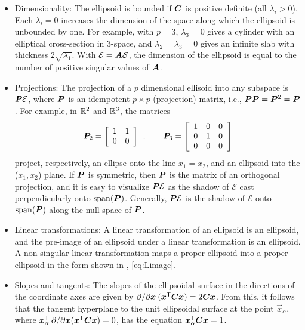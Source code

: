 \begin{itemize}
 \item Dimensionality: The ellipsoid is bounded if $\bm{C}$ is positive definite (all $\lambda_i > 0$).
 Each $\lambda_i = 0$ increases the dimension of the space along which the ellipsoid is unbounded by one.
For example, with $p=3$, $\lambda_3=0$ gives a
cylinder with an elliptical cross-section in 3-space, and  $\lambda_2 = \lambda_3=0$ gives an infinite slab with thickness $2 \sqrt{\lambda_1}$. With $\mathcal{E} = \bm{A} \mathcal{S}$, the dimension of the ellipsoid is equal to the number of positive singular values of $\bm{A}$.
 \item Projections: The projection of a $p$ dimensional ellisoid into any subspace
is $\bm{P} \mathcal{E}$, where
$\bm{P}$ is an idempotent $p \times p$ (projection) matrix, i.e., $\bm{P} \bm{P}= \bm{P}^2 = \bm{P}$.
For example, in $\mathbb{R}^{2}$ and $\mathbb{R}^{3}$,
the matrices
\[
\bm{P}_2 =
\left[
\begin{array}{cc}
 1 & 1  \\
 0 & 0  \\
\end{array}
\right]
\:\: , \quad\quad
\bm{P}_3 =
\left[
\begin{array}{ccc}
 1 & 0 & 0 \\
 0 & 1 & 0 \\
 0 & 0 & 0 \\
\end{array}
\right]
\]
project, respectively, an ellipse onto the line $x_1 = x_2$, and an ellipsoid into the ($x_1, x_2$) plane.  If $\bm{P}$ is symmetric, then $\bm{P}$ is the matrix of an orthogonal projection, and it is easy to visualize  $\bm{P} \mathcal{E}$ as the shadow of  $\mathcal{E}$ cast perpendicularly onto  $\mathrm{span}(\bm{P})$. Generally,  $\bm{P} \mathcal{E}$ is the shadow of $\mathcal{E}$  onto  $\mathrm{span}(\bm{P})$ along the null space of $\bm{P}$.

 \item Linear transformations: A linear transformation of an ellipsoid is an ellipsoid, and the pre-image of an ellipsoid under a linear transformation is an ellipsoid.  
A non-singular linear transformation maps a proper ellipsoid into a proper ellipsoid in the form shown in , \eqref{eq:Limage}. 

 \item Slopes and tangents: The slopes of the ellipsoidal surface in the directions of the coordinate
 axes are given by $\partial / \partial \bm{x} \: (\bm{x}^\mathsf{T} \bm{C} \bm{x}) = 2 \bm{C} \bm{x}$.
 From this, it follows that the tangent hyperplane to the unit ellipsoidal surface at the point
 $\vec{x}_\alpha$, where $\bm{x}_\alpha^\mathsf{T} \: \partial / \partial \bm{x} (\bm{x}^\mathsf{T} \bm{C} \bm{x}) = 0$,
 has the equation $\bm{x}_\alpha ^\mathsf{T} \bm{C} \bm{x} = 1$.
\end{itemize}

